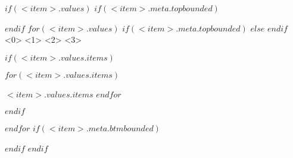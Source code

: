 $if(<item>.values)$
$if(<item>.meta.topbounded)$
\begin{cventries}
$endif$
    $for(<item>.values)$
    $if(<item>.meta.topbounded)$
    $else$
    \newline
    $endif$
    \cventry
    {<0>}
    {<1>}
    {<2>}
    {<3>}
    {
    $if(<item>.values.items)$
    \begin{cvitems}
        $for(<item>.values.items)$
            \item{$<item>.values.items$}
        $endfor$
    \end{cvitems}
    $endif$
    }
    \linebreak
    $endfor$
$if(<item>.meta.btmbounded)$
\end{cventries}
$endif$
$endif$